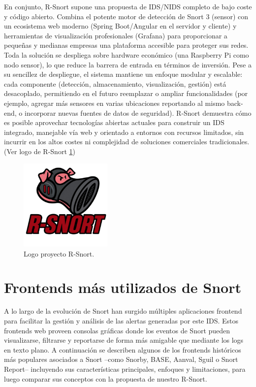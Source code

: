 \documentclass[11pt,a4paper,twoside]{report}
\begin{document}
En conjunto, R-Snort supone una propuesta de IDS/NIDS completo de bajo coste y código abierto. Combina el potente motor de detección de Snort 3 (sensor) con un ecosistema web moderno (Spring Boot/Angular en el servidor y cliente) y herramientas de visualización profesionales (Grafana) para proporcionar a pequeñas y medianas empresas una plataforma accesible para proteger sus redes. Toda la solución se despliega sobre hardware económico (una Raspberry Pi como nodo sensor), lo que reduce la barrera de entrada en términos de inversión. Pese a su sencillez de despliegue, el sistema mantiene un enfoque modular y escalable: cada componente (detección, almacenamiento, visualización, gestión) está desacoplado, permitiendo en el futuro reemplazar o ampliar funcionalidades (por ejemplo, agregar más sensores en varias ubicaciones reportando al mismo back-end, o incorporar nuevas fuentes de datos de seguridad). R-Snort demuestra cómo es posible aprovechar tecnologías abiertas actuales para construir un IDS integrado, manejable vía web y orientado a entornos con recursos limitados, sin incurrir en los altos costes ni complejidad de soluciones comerciales tradicionales. (Ver logo de R-Snort \ref{fig:logo-rsnort})

\begin{figure}[hbtp]
	\centering
	\includegraphics[width=0.4\textwidth]{logo.png}
	\caption{Logo proyecto R-Snort.}
	\label{fig:logo-rsnort}
\end{figure}

\section{Frontends más utilizados de Snort}

A lo largo de la evolución de Snort han surgido múltiples aplicaciones frontend para facilitar la gestión y análisis de las alertas generadas por este IDS. Estos frontends web proveen consolas gráficas donde los eventos de Snort pueden visualizarse, filtrarse y reportarse de forma más amigable que mediante los logs en texto plano. A continuación se describen algunos de los frontends históricos más populares asociados a Snort –como Snorby, BASE, Aanval, Sguil o Snort Report– incluyendo sus características principales, enfoques y limitaciones, para luego comparar sus conceptos con la propuesta de nuestro R-Snort.\newline
\end{document}
